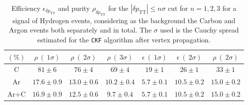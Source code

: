 \begin{table}
    \centering
    \begin{tabular}{||c|c|c|c|c|c|c||}
         \hline
          $(\%)$&  $\rho \ (\ 1\sigma)$&  $\rho \ (\ 2\sigma)$&  $\rho \ (\ 3\sigma)$&  $\epsilon \ (\ 1\sigma)$&  $\epsilon \ (\ 2\sigma)$&  $\rho \ (\ 2\sigma)$\\
         \hline \hline
         C &  $81\pm6$&  $76\pm4$ & $69\pm4$  &  $19\pm1$& $26\pm1$ &$33\pm1$ \\
         \hline
         Ar &  $17.6\pm0.9$& $13.0\pm0.6$ & $10.2\pm0.4$ & $5.7\pm0.1$ & $10.5\pm0.2$ & $15.0\pm0.2$\\
         \hline
         Ar+C& $16.9\pm0.9$ & $12.5\pm0.6$ & $9.7\pm0.4$ & $5.7\pm0.1$  & $10.5\pm0.2$ & $15.0\pm0.2$\\
         \hline
    \end{tabular}
    \caption{Efficiency $\epsilon_{\delta p_\text{TT}}$ and purity $\rho_{\delta p_\text{TT}}$ for the $|\delta p_\text{TT}|\leq n\sigma$ cut for $n=1,2,3$ for a signal of Hydrogen events, considering as the background the Carbon and Argon events both separately and in total. The $\sigma$ used is the Cauchy spread estimated for the \texttt{CKF} algorithm after vertex propagation.}
    \label{tab:dpTT_eff+pur}
\end{table}



